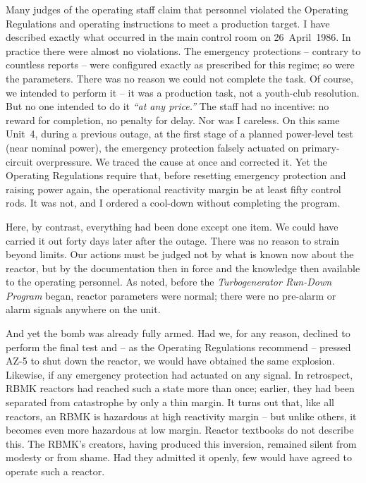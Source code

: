 \documentclass[openright]{bookest}
\begin{document}
Many judges of the operating staff claim that personnel violated the Operating Regulations and operating instructions to meet a production target. I have described exactly what occurred in the main control room on 26~April~1986. In practice there were almost no violations. The emergency protections -- contrary to countless reports -- were configured exactly as prescribed for this regime; so were the parameters. There was no reason we could not complete the task. Of course, we intended to perform it -- it was a production task, not a youth-club resolution. But no one intended to do it \textit{``at any price.''} The staff had no incentive: no reward for completion, no penalty for delay. Nor was I careless. On this same Unit~4, during a previous outage, at the first stage of a planned power-level test (near nominal power), the emergency protection falsely actuated on primary-circuit overpressure. We traced the cause at once and corrected it. Yet the Operating Regulations require that, before resetting emergency protection and raising power again, the operational reactivity margin be at least fifty control rods. It was not, and I ordered a cool-down without completing the program. 

Here, by contrast, everything had been done except one item. We could have carried it out forty days later after the outage. There was no reason to strain beyond limits. Our actions must be judged not by what is known now about the reactor, but by the documentation then in force and the knowledge then available to the operating personnel. As noted, before the \textit{Turbogenerator Run-Down Program} began, reactor parameters were normal; there were no pre-alarm or alarm signals anywhere on the unit.

And yet the bomb was already fully armed. Had we, for any reason, declined to perform the final test and -- as the Operating Regulations recommend -- pressed AZ-5 to shut down the reactor, we would have obtained the same explosion. Likewise, if any emergency protection had actuated on any signal. In retrospect, RBMK reactors had reached such a state more than once; earlier, they had been separated from catastrophe by only a thin margin. It turns out that, like all reactors, an RBMK is hazardous at high reactivity margin -- but unlike others, it becomes even more hazardous at low margin. Reactor textbooks do not describe this. The RBMK's creators, having produced this inversion, remained silent from modesty or from shame. Had they admitted it openly, few would have agreed to operate such a reactor.
\end{document}
